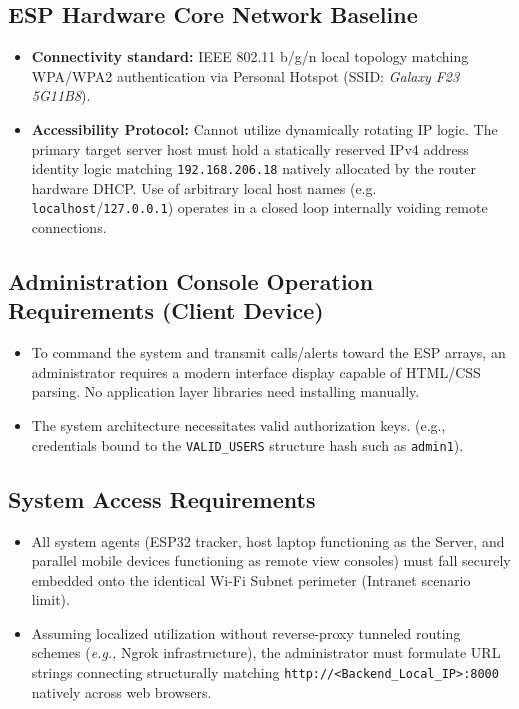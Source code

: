 \documentclass[a4paper,12pt]{article}
\begin{document}
\subsection{ESP Hardware Core Network Baseline}
\begin{itemize}
    \item \textbf{Connectivity standard:} IEEE 802.11 b/g/n local topology matching WPA/WPA2 authentication via Personal Hotspot (SSID: \textit{Galaxy F23 5G11B8}). 
    \item \textbf{Accessibility Protocol:} Cannot utilize dynamically rotating IP logic. The primary target server host must hold a statically reserved IPv4 address identity logic matching \texttt{192.168.206.18} natively allocated by the router hardware DHCP. Use of arbitrary local host names (e.g. \texttt{localhost}/\texttt{127.0.0.1}) operates in a closed loop internally voiding remote connections. 
\end{itemize}

\subsection{Administration Console Operation Requirements (Client Device)}
\begin{itemize}
    \item To command the system and transmit calls/alerts toward the ESP arrays, an administrator requires a modern interface display capable of HTML/CSS parsing. No application layer libraries need installing manually. 
    \item The system architecture necessitates valid authorization keys. (e.g., credentials bound to the \texttt{VALID\_USERS} structure hash such as \texttt{admin1}).
\end{itemize}

\subsection{System Access Requirements}
\begin{itemize}
    \item All system agents (ESP32 tracker, host laptop functioning as the Server, and parallel mobile devices functioning as remote view consoles) must fall securely embedded onto the identical Wi-Fi Subnet perimeter (Intranet scenario limit).
    \item Assuming localized utilization without reverse-proxy tunneled routing schemes (\textit{e.g.,} Ngrok infrastructure), the administrator must formulate URL strings connecting structurally matching \texttt{http://<Backend\_Local\_IP>:8000} natively across web browsers.
\end{itemize}
\end{document}
